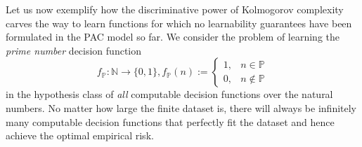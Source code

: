 
Let us now exemplify how the discriminative power of Kolmogorov complexity carves the way to learn functions for which no learnability guarantees have been formulated in the PAC model so far.
We consider the problem of learning the \textit{prime number} decision function
\begin{equation}
	\label{eq:prime-number-decision-function}
	f_{\mathbb{P}}:\mathbb{N}\to\{0,1\}, f_{\mathbb{P}}(n):=\begin{cases}
		1,& n\in\mathbb{P}\\
		0,& n\notin\mathbb{P}
	\end{cases}
\end{equation}  
in the hypothesis class of \textit{all} computable decision functions over the natural numbers.
No matter how large the finite dataset is, there will always be infinitely many computable decision functions that perfectly fit the dataset and hence achieve the optimal empirical risk.

